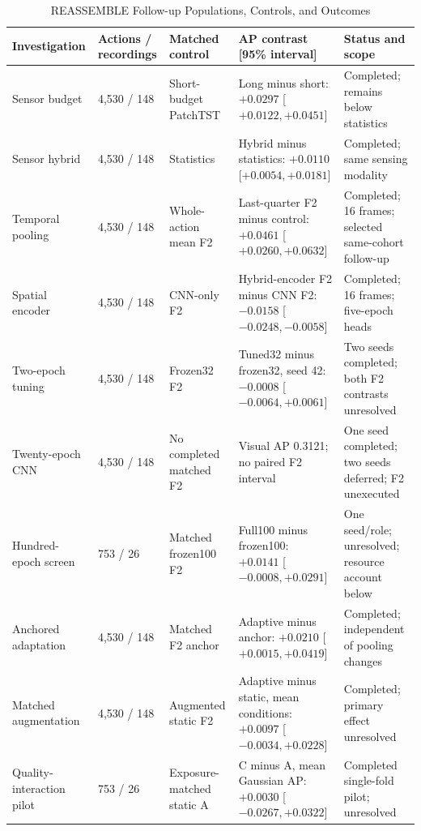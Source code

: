 \begin{table}[p]
\caption{REASSEMBLE Follow-up Populations, Controls, and Outcomes}
\label{tab:reassemble-followups}
\centering\footnotesize\setlength{\tabcolsep}{3pt}
\begin{tabularx}{\linewidth}{@{}P{.18\linewidth}P{.12\linewidth}YP{.27\linewidth}Y@{}}\toprule
Investigation & Actions / recordings & Matched control & AP contrast [95\% interval] & Status and scope\\\midrule
Sensor budget & 4,530 / 148 & Short-budget PatchTST & Long minus short: $+0.0297$ [$+0.0122, +0.0451$] & Completed; remains below statistics\\\addlinespace
Sensor hybrid & 4,530 / 148 & Statistics & Hybrid minus statistics: $+0.0110$ [$+0.0054, +0.0181$] & Completed; same sensing modality\\\addlinespace
Temporal pooling & 4,530 / 148 & Whole-action mean F2 & Last-quarter F2 minus control: $+0.0461$ [$+0.0260, +0.0632$] & Completed; 16 frames; selected same-cohort follow-up\\\addlinespace
Spatial encoder & 4,530 / 148 & CNN-only F2 & Hybrid-encoder F2 minus CNN F2: $-0.0158$ [$-0.0248, -0.0058$] & Completed; 16 frames; five-epoch heads\\\addlinespace
Two-epoch tuning & 4,530 / 148 & Frozen32 F2 & Tuned32 minus frozen32, seed 42: $-0.0008$ [$-0.0064, +0.0061$] & Two seeds completed; both F2 contrasts unresolved\\\addlinespace
Twenty-epoch CNN & 4,530 / 148 & No completed matched F2 & Visual AP 0.3121; no paired F2 interval & One seed completed; two seeds deferred; F2 unexecuted\\\addlinespace
Hundred-epoch screen & 753 / 26 & Matched frozen100 F2 & Full100 minus frozen100: $+0.0141$ [$-0.0008, +0.0291$] & One seed/role; unresolved; resource account below\\\addlinespace
Anchored adaptation & 4,530 / 148 & Matched F2 anchor & Adaptive minus anchor: $+0.0210$ [$+0.0015, +0.0419$] & Completed; independent of pooling changes\\\addlinespace
Matched augmentation & 4,530 / 148 & Augmented static F2 & Adaptive minus static, mean conditions: $+0.0097$ [$-0.0034, +0.0228$] & Completed; primary effect unresolved\\\addlinespace
Quality-interaction pilot & 753 / 26 & Exposure-matched static A & C minus A, mean Gaussian AP: $+0.0030$ [$-0.0267, +0.0322$] & Completed single-fold pilot; unresolved\\\bottomrule
\end{tabularx}
\end{table}

